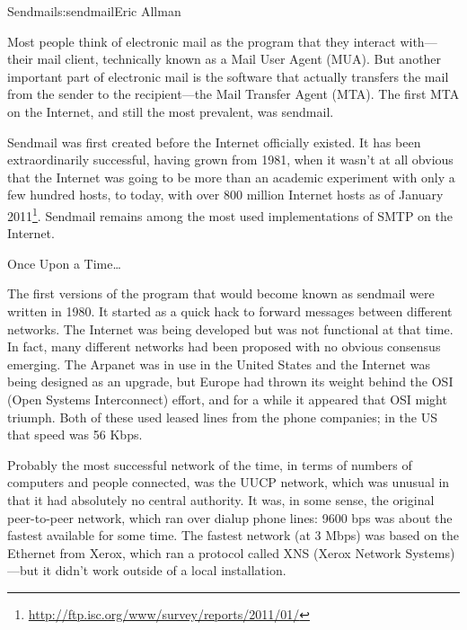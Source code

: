 \begin{aosachapter}{Sendmail}{s:sendmail}{Eric Allman}

Most people think of electronic mail as the program that they interact
with---their mail client, technically known as a Mail User Agent
(MUA).  But another important part of electronic mail is the software
that actually transfers the mail from the sender to the
recipient---the Mail Transfer Agent (MTA).  The first MTA on the
Internet, and still the most prevalent, was sendmail.

Sendmail was first created before the Internet officially existed. It
has been extraordinarily successful, having grown from 1981, when it
wasn't at all obvious that the Internet was going to be more than an
academic experiment with only a few hundred hosts, to today, with over
800 million Internet hosts as of January
2011\footnote{\url{http://ftp.isc.org/www/survey/reports/2011/01/}}.
Sendmail remains among the most used implementations of SMTP on the Internet.

\begin{aosasect1}{Once Upon a Time\ldots}

The first versions of the program that would become known as sendmail
were written in 1980. It started as a quick hack to forward messages
between different networks.  The Internet was being developed but was
not functional at that time.  In fact, many different networks had been
proposed with no obvious consensus emerging.  The Arpanet was in use
in the United States and the Internet was being designed as an
upgrade, but Europe had thrown its weight behind the OSI (Open Systems
Interconnect) effort, and for a while it appeared that OSI might
triumph. Both of these used leased lines from the phone companies; in
the US that speed was 56 Kbps.

Probably the most successful network of the time,
in terms of numbers of computers
and people connected, was the UUCP network, which was unusual in that
it had absolutely no central authority. It was, in some sense, the
original peer-to-peer network, which ran over dialup phone lines: 9600
bps was about the fastest available for some time. The fastest network
(at 3 Mbps) was based on the Ethernet from Xerox, which ran a protocol
called XNS (Xerox Network Systems)---but it didn't work outside of a
local installation.


\end{aosasect1}
\end{aosachapter}
